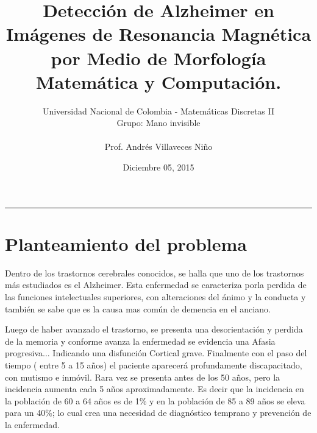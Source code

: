 \documentclass[12pt]{article}
\title{\color{Black}Detección de Alzheimer en Imágenes de Resonancia Magnética
 por Medio de Morfología Matemática y Computación.}
\author{Universidad Nacional de Colombia - Matemáticas Discretas II \\  Grupo: Mano invisible \\
\\
Prof. Andrés Villaveces Niño}
\date{Diciembre 05, 2015}
\begin{document}
\raggedright{}


\rule{150mm}{0.5mm}
\maketitle
\newpage
\tableofcontents
\newpage


\section{\color{Black}Planteamiento del problema}
\justifying

Dentro de los trastornos cerebrales conocidos, se halla que uno de los trastornos más estudiados es el Alzheimer. Esta enfermedad se caracteriza porla perdida de las funciones intelectuales superiores, con alteraciones del ánimo y la conducta y también se sabe que es la causa mas común de demencia en el anciano.

Luego de haber avanzado el trastorno, se presenta una desorientación y perdida de la memoria y conforme avanza la enfermedad se evidencia una Afasia progresiva... Indicando una disfunción Cortical grave. 
Finalmente con el paso del tiempo ( entre 5 a 15 años) el paciente aparecerá profundamente discapacitado, con mutismo e inmóvil. Rara vez se presenta antes de los 50 años, pero la incidencia aumenta cada 5 años aproximadamente. Es decir que la incidencia en la población de 60 a 64 años es de 1\% y en la población de 85 a 89 años se eleva para un 40\%; lo cual crea una necesidad de diagnóstico temprano y prevención de la enfermedad\cite[pag 1325]{kumar2010robbins}.
\end{document}
